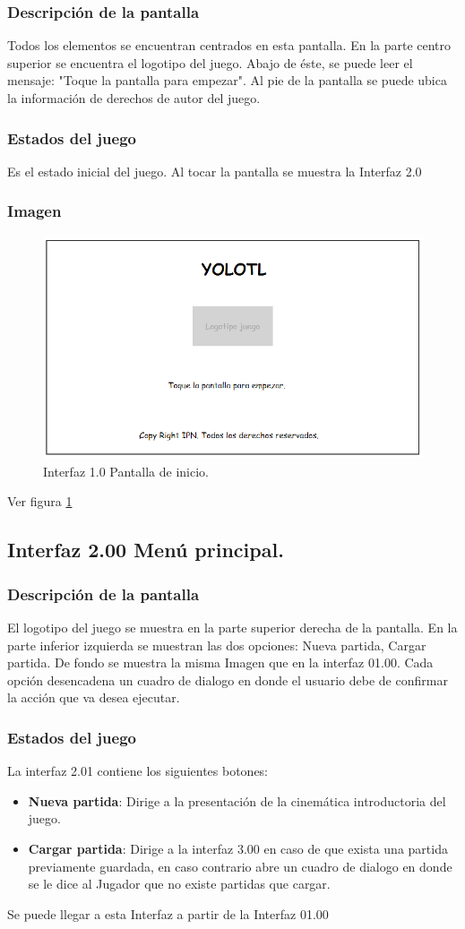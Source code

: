 \documentclass[11pt,letterpaper]{article}
\begin{document}
	\subsubsection{Descripción de la pantalla}
Todos los elementos se encuentran centrados en esta pantalla. En la parte centro superior se encuentra el logotipo del juego. Abajo de éste, se puede leer el mensaje: "Toque la pantalla para empezar". Al pie de la pantalla se puede ubica la información de derechos de autor del juego.
	\subsubsection{Estados del juego}
Es el estado inicial del juego.
Al tocar la pantalla se muestra la Interfaz 2.0
	\subsubsection{Imagen}
\begin{figure}
  \centering
   \includegraphics[width=0.6 \textwidth]{Imagenes/interfaz00}
  \caption{Interfaz 1.0 Pantalla de inicio.}
  \label{fig:PInicio}
\end{figure} 

Ver figura \ref{fig:PInicio}


\subsection{Interfaz 2.00 Menú principal.}
	\subsubsection{Descripción de la pantalla}
El logotipo del juego se muestra en la parte superior derecha de la pantalla. En la parte inferior izquierda se muestran las dos opciones: Nueva partida, Cargar partida. De fondo se muestra la misma Imagen que en la interfaz 01.00. 
Cada opción desencadena un cuadro de dialogo en donde el usuario debe de confirmar la acción que va desea ejecutar.
	\subsubsection{Estados del juego}
La interfaz 2.01 contiene los siguientes botones:
\begin{itemize}
	\item \textbf{Nueva partida}:  Dirige a la presentación de la cinemática introductoria del juego.
	\item \textbf{Cargar partida}: Dirige a la interfaz 3.00 en caso de que exista una partida previamente guardada, en caso contrario abre un cuadro de dialogo en donde se le dice al Jugador que no existe partidas que cargar.
\end{itemize}
Se puede llegar a esta Interfaz a partir de la Interfaz 01.00 
\end{document}
